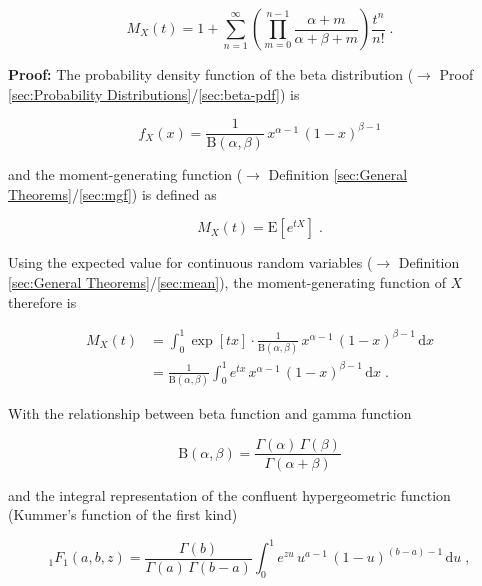 \documentclass[a4paper,12pt,twoside]{book}
\begin{document}
\begin{equation} \label{eq:beta-mgf-beta-mgf}
M_X(t) = 1 + \sum_{n=1}^{\infty} \left( \prod_{m=0}^{n-1} \frac{\alpha + m}{\alpha + \beta + m} \right) \frac{t^n}{n!} \; .
\end{equation}


\vspace{1em}
\textbf{Proof:} The probability density function of the beta distribution ($\rightarrow$ Proof \ref{sec:Probability Distributions}/\ref{sec:beta-pdf}) is

\begin{equation} \label{eq:beta-mgf-beta-pdf}
f_X(x) = \frac{1}{\mathrm{B}(\alpha, \beta)} \, x^{\alpha-1} \, (1-x)^{\beta-1}
\end{equation}

and the moment-generating function ($\rightarrow$ Definition \ref{sec:General Theorems}/\ref{sec:mgf}) is defined as

\begin{equation} \label{eq:beta-mgf-mgf-var}
M_X(t) = \mathrm{E} \left[ e^{tX} \right] \; .
\end{equation}

Using the expected value for continuous random variables ($\rightarrow$ Definition \ref{sec:General Theorems}/\ref{sec:mean}), the moment-generating function of $X$ therefore is

\begin{equation} \label{eq:beta-mgf-beta-mgf-s1}
\begin{split}
M_X(t) &= \int_{0}^{1} \exp[tx] \cdot \frac{1}{\mathrm{B}(\alpha, \beta)} \, x^{\alpha-1} \, (1-x)^{\beta-1} \, \mathrm{d}x \\
&= \frac{1}{\mathrm{B}(\alpha, \beta)} \int_{0}^{1} e^{tx} \, x^{\alpha-1} \, (1-x)^{\beta-1} \, \mathrm{d}x \; .
\end{split}
\end{equation}

With the relationship between beta function and gamma function

\begin{equation} \label{eq:beta-mgf-beta-gam-fct}
\mathrm{B}(\alpha, \beta) = \frac{\Gamma(\alpha) \, \Gamma(\beta)}{\Gamma(\alpha+\beta)}
\end{equation}

and the integral representation of the confluent hypergeometric function (Kummer's function of the first kind)

\begin{equation} \label{eq:beta-mgf-con-hyp-geo-fct-int}
{}_1 F_1(a,b,z) = \frac{\Gamma(b)}{\Gamma(a) \, \Gamma(b-a)} \int_{0}^{1} e^{zu} \, u^{a-1} \, (1-u)^{(b-a)-1} \, \mathrm{d}u \; ,
\end{equation}
\end{document}
